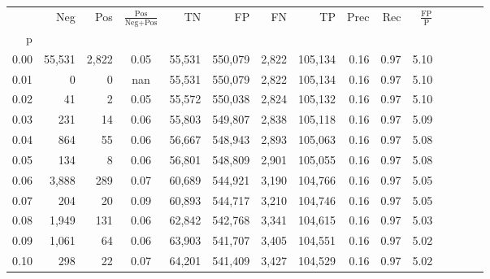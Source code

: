 \begin{tabular}{rrrcrrrrrrrrrrr}
\toprule
{} &     Neg &     Pos & $\frac{\text{Pos}}{\text{Neg}+\text{Pos}}$ &       TN &       FP &       FN &       TP &  Prec &   Rec & $\frac{\text{FP}}{\text{P}}$ \\
p    &         &         &                                            &          &          &          &          &       &       &                              \\
\midrule
0.00 &  55,531 &   2,822 &                                       0.05 &   55,531 &  550,079 &    2,822 &  105,134 &  0.16 &  0.97 &                         5.10 \\
0.01 &       0 &       0 &                                        nan &   55,531 &  550,079 &    2,822 &  105,134 &  0.16 &  0.97 &                         5.10 \\
0.02 &      41 &       2 &                                       0.05 &   55,572 &  550,038 &    2,824 &  105,132 &  0.16 &  0.97 &                         5.10 \\
0.03 &     231 &      14 &                                       0.06 &   55,803 &  549,807 &    2,838 &  105,118 &  0.16 &  0.97 &                         5.09 \\
0.04 &     864 &      55 &                                       0.06 &   56,667 &  548,943 &    2,893 &  105,063 &  0.16 &  0.97 &                         5.08 \\
0.05 &     134 &       8 &                                       0.06 &   56,801 &  548,809 &    2,901 &  105,055 &  0.16 &  0.97 &                         5.08 \\
0.06 &   3,888 &     289 &                                       0.07 &   60,689 &  544,921 &    3,190 &  104,766 &  0.16 &  0.97 &                         5.05 \\
0.07 &     204 &      20 &                                       0.09 &   60,893 &  544,717 &    3,210 &  104,746 &  0.16 &  0.97 &                         5.05 \\
0.08 &   1,949 &     131 &                                       0.06 &   62,842 &  542,768 &    3,341 &  104,615 &  0.16 &  0.97 &                         5.03 \\
0.09 &   1,061 &      64 &                                       0.06 &   63,903 &  541,707 &    3,405 &  104,551 &  0.16 &  0.97 &                         5.02 \\
0.10 &     298 &      22 &                                       0.07 &   64,201 &  541,409 &    3,427 &  104,529 &  0.16 &  0.97 &                         5.02 \\

\end{tabular}
